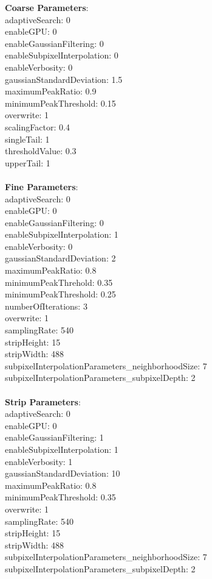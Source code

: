 \documentclass[11pt]{article}
\begin{document}
\textbf{Coarse Parameters}: \\
adaptiveSearch: 0\\
enableGPU: 0\\
enableGaussianFiltering: 0\\
enableSubpixelInterpolation: 0\\
enableVerbosity: 0\\
gaussianStandardDeviation: 1.5\\
maximumPeakRatio: 0.9\\
minimumPeakThreshold: 0.15\\
overwrite: 1\\
scalingFactor: 0.4\\
singleTail: 1\\
thresholdValue: 0.3\\
upperTail: 1\\
\\
\textbf{Fine Parameters}: \\
adaptiveSearch: 0\\
enableGPU: 0\\
enableGaussianFiltering: 0\\
enableSubpixelInterpolation: 1\\
enableVerbosity: 0\\
gaussianStandardDeviation: 2\\
maximumPeakRatio: 0.8\\
minimumPeakThrehold: 0.35\\
minimumPeakThreshold: 0.25\\
numberOfIterations: 3\\
overwrite: 1\\
samplingRate: 540\\
stripHeight: 15\\
stripWidth: 488\\
subpixelInterpolationParameters\_neighborhoodSize: 7\\
subpixelInterpolationParameters\_subpixelDepth: 2\\
\\
\textbf{Strip Parameters}: \\
adaptiveSearch: 0\\
enableGPU: 0\\
enableGaussianFiltering: 1\\
enableSubpixelInterpolation: 1\\
enableVerbosity: 1\\
gaussianStandardDeviation: 10\\
maximumPeakRatio: 0.8\\
minimumPeakThreshold: 0.35\\
overwrite: 1\\
samplingRate: 540\\
stripHeight: 15\\
stripWidth: 488\\
subpixelInterpolationParameters\_neighborhoodSize: 7\\
subpixelInterpolationParameters\_subpixelDepth: 2\\
\\
\newpage
\end{document}
